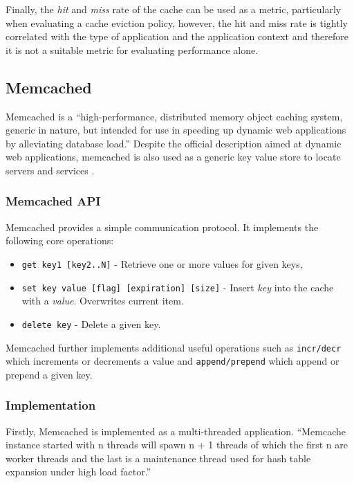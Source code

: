 Finally, the \textit{hit} and \textit{miss} rate of the cache can be used as a metric, particularly when evaluating a cache eviction policy, however, the hit and miss rate is tightly correlated with the type of application and the application context and therefore it is not a suitable metric for evaluating performance alone.


\subsection{Memcached}

Memcached is a ``high-performance, distributed memory object caching system, generic in nature, but intended for use in speeding up dynamic web applications by alleviating database load.'' \cite{interactive2006memcached} Despite the official description aimed at dynamic web applications, memcached is also used as a generic key value store to locate servers and services \cite{atikoglu2012workload}.

\subsubsection{Memcached API}
Memcached provides a simple communication protocol. It implements the following core operations:

\begin{itemize}
    \item \texttt{get key1 [key2..N]} - Retrieve one or more values for given keys,
    \item \texttt{set key value [flag] [expiration] [size]} - Insert \textit{key} into the cache with a \textit{value}. Overwrites current item.
    \item \texttt{delete key} - Delete a given key.
\end{itemize}

Memcached further implements additional useful operations such as \texttt{incr/decr} which increments or decrements a value and \texttt{append/prepend} which append or prepend a given key.

\subsubsection{Implementation}
Firstly, Memcached is implemented as a multi-threaded application. ``Memcache instance started with n threads will spawn n + 1 threads of which the first n are worker threads and the last
is a maintenance thread used for hash table expansion under high load factor.'' \cite{solarflarememcached}

